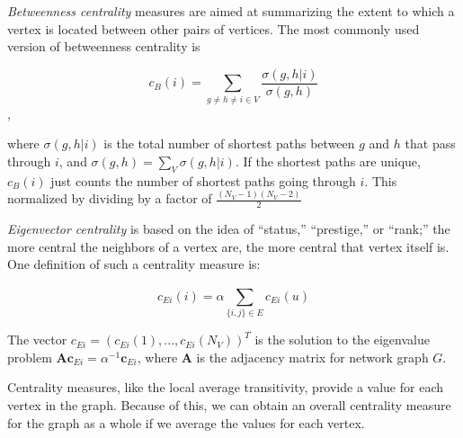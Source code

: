 \documentclass[12pt,twoside]{amherstthesis}
\begin{document}
  \emph{Betweenness centrality} measures are aimed at summarizing the
  extent to which a vertex is located between other pairs of vertices. The
  most commonly used version of betweenness centrality is
  
  \[c_{B}(i) = \sum_{g \neq h \neq i \in V}^{} \frac {\sigma(g,h|i)} {\sigma(g,h)}\],
  
  where \(\sigma(g,h|i)\) is the total number of shortest paths between
  \(g\) and \(h\) that pass through \(i\), and
  \(\sigma(g,h) = \sum_{V}^{} \sigma(g,h|i)\). If the shortest paths are
  unique, \(c_{B}(i)\) just counts the number of shortest paths going
  through \(i\). This normalized by dividing by a factor of
  \(\frac {(N_V - 1)(N_V - 2)} {2}\)
  
  \emph{Eigenvector centrality} is based on the idea of ``status,''
  ``prestige,'' or ``rank;'' the more central the neighbors of a vertex
  are, the more central that vertex itself is. One definition of such a
  centrality measure is:
  
  \[c_{Ei}(i) = \alpha \sum_{\{i,j\} \in E}^{} c_{Ei} (u)\]
  
  The vector \(c_{Ei} = (c_{Ei}(1), ..., c_{Ei}(N_V))^T\) is the solution
  to the eigenvalue problem
  \(\textbf{A}\textbf{c}_{Ei} = \alpha^{-1}\textbf{c}_{Ei}\), where
  \(\textbf{A}\) is the adjacency matrix for network graph \(G\).
  
  Centrality measures, like the local average transitivity, provide a
  value for each vertex in the graph. Because of this, we can obtain an
  overall centrality measure for the graph as a whole if we average the
  values for each vertex.
  
\end{document}
